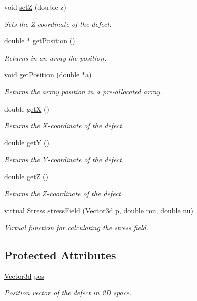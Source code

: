 \begin{DoxyCompactItemize}
void \hyperlink{classDefect_abb0b16c44a1b04d782f5c5f598b49d5b}{set\-Z} (double z)
\begin{DoxyCompactList}\small\item\em Sets the Z-\/coordinate of the defect. \end{DoxyCompactList}\item 
double $\ast$ \hyperlink{classDefect_a6842fba3ad14032766ccf0437afcbced}{get\-Position} ()
\begin{DoxyCompactList}\small\item\em Returns in an array the position. \end{DoxyCompactList}\item 
void \hyperlink{classDefect_aace5c752b85c368631746abc3d5bd714}{get\-Position} (double $\ast$a)
\begin{DoxyCompactList}\small\item\em Returns the array position in a pre-\/allocated array. \end{DoxyCompactList}\item 
double \hyperlink{classDefect_a01b96c453c13db82b5835682e1849dc0}{get\-X} ()
\begin{DoxyCompactList}\small\item\em Returns the X-\/coordinate of the defect. \end{DoxyCompactList}\item 
double \hyperlink{classDefect_a9ea8df3b4c621762a327813056e63911}{get\-Y} ()
\begin{DoxyCompactList}\small\item\em Returns the Y-\/coordinate of the defect. \end{DoxyCompactList}\item 
double \hyperlink{classDefect_a6f59edeca7ca8bfa01c54fd6b1a62374}{get\-Z} ()
\begin{DoxyCompactList}\small\item\em Returns the Z-\/coordinate of the defect. \end{DoxyCompactList}\item 
virtual \hyperlink{classStress}{Stress} \hyperlink{classDefect_a5730a89ce804d75090c9fa35ffdfefa2}{stress\-Field} (\hyperlink{classVector3d}{Vector3d} p, double mu, double nu)
\begin{DoxyCompactList}\small\item\em Virtual function for calculating the stress field. \end{DoxyCompactList}\end{DoxyCompactItemize}
\subsection*{Protected Attributes}
\begin{DoxyCompactItemize}
\item 
\hyperlink{classVector3d}{Vector3d} \hyperlink{classDefect_aed2731c1beefc22e3db6ad5b18194cdd}{pos}
\begin{DoxyCompactList}\small\item\em Position vector of the defect in 2\-D space. \end{DoxyCompactList}\end{DoxyCompactItemize}


